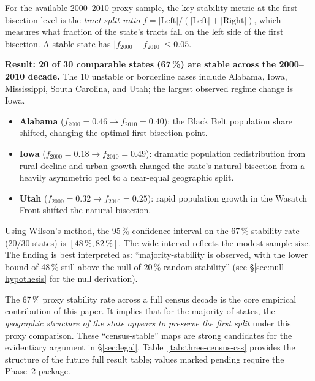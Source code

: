 For the available 2000--2010 proxy sample, the key stability metric at the
first-bisection level is the
\emph{tract split ratio} $f = |\mathrm{Left}| / (|\mathrm{Left}| + |\mathrm{Right}|)$,
which measures what fraction of the state's tracts fall on the left side of
the first bisection.
A stable state has $|f_{2000} - f_{2010}| \leq 0.05$.

\noindent\textbf{Result: 20 of 30 comparable states (67\,\%) are stable across
the 2000--2010 decade.}
The 10 unstable or borderline cases include Alabama, Iowa, Mississippi,
South Carolina, and Utah; the largest observed regime change is Iowa.

\begin{itemize}
\item \textbf{Alabama} ($f_{2000}=0.46 \to f_{2010}=0.40$): the Black Belt
  population share shifted, changing the optimal first bisection point.
\item \textbf{Iowa} ($f_{2000}=0.18 \to f_{2010}=0.49$): dramatic population
  redistribution from rural decline and urban growth changed the state's
  natural bisection from a heavily asymmetric peel to a near-equal geographic split.
\item \textbf{Utah} ($f_{2000}=0.32 \to f_{2010}=0.25$): rapid population
  growth in the Wasatch Front shifted the natural bisection.
\end{itemize}

Using Wilson's method, the 95\,\% confidence interval on the 67\,\%
stability rate (20/30 states) is $[48\,\%, 82\,\%]$.
The wide interval reflects the modest sample size.
The finding is best interpreted as: ``majority-stability is observed, with
the lower bound of 48\,\% still above the null of 20\,\% random stability''
(see \S\ref{sec:null-hypothesis} for the null derivation).

The 67\,\% proxy stability rate across a full census decade is the core empirical
contribution of this paper.
It implies that for the majority of states, the \emph{geographic structure
of the state appears to preserve the first split} under this proxy comparison.
These ``census-stable'' maps are strong candidates for the evidentiary
argument in \S\ref{sec:legal}.
Table~\ref{tab:three-census-css} provides the structure of the future full
result table; values marked pending require the Phase~2 package.

